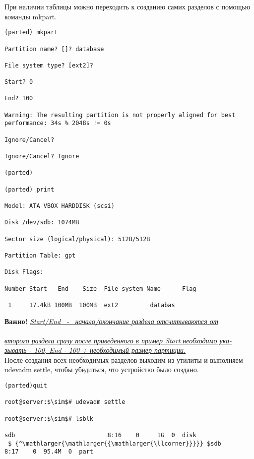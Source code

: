 \documentclass[14pt, a4paper]{article}
\begin{document}
\vspace{0.2cm}
При наличии таблицы можно переходить к созданию самих разделов с помощью команды \colorbox{backcolour}{mkpart}.
\vspace{0.3cm}

\begin{lstlisting}
(parted) mkpart

Partition name? []? database

File system type? [ext2]?

Start? 0

End? 100

Warning: The resulting partition is not properly aligned for best 
performance: 34s % 2048s != 0s

Ignore/Cancel?

Ignore/Cancel? Ignore

(parted)

(parted) print

Model: ATA VBOX HARDDISK (scsi)

Disk /dev/sdb: 1074MB

Sector size (logical/physical): 512B/512B

Partition Table: gpt

Disk Flags:

Number Start   End    Size  File system Name      Flag

 1     17.4kB 100MB  100MB  ext2         databas

\end{lstlisting}

\vspace{0.2cm}

\textbf{Важно!} \underline{\textit{Start/End \ - \ начало/окончание раздела отсчитываются от}} \\
\underline{} \\
\underline{\textit{второго раздела сразу после приведенного в пример Start необходимо ука-}} \\
\underline{\textit{зывать - 100, End - 100 + необходимый размер партиции.}}\\

После создания всех необходимых разделов выходим из утилиты и выполняем \colorbox{backcolour}{udevadm settle},
чтобы убедиться, что устройство было создано. 
\newpage 

\begin{lstlisting}[mathescape=true]
(parted)quit

root@server:$\sim$# udevadm settle

root@server:$\sim$# lsblk

sdb                          8:16    0     1G  0  disk
 $ {^\mathlarger{\mathlarger{{\mathlarger{\llcorner}}}}} $sdb                        8:17    0  95.4M  0  part
\end{lstlisting}
\end{document}
